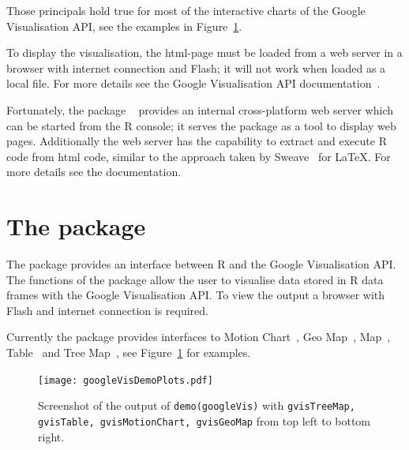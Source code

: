 Those principals hold true for most of the interactive charts of the
Google Visualisation API, see the examples in Figure~\ref{demos}.

To display the visualisation, the html-page must be loaded from a
web server in a browser with internet connection and Flash; it will not
work when loaded as a local file. For more details see the Google
Visualisation API documentation~\cite{GoogleMotionChart}.

Fortunately, the package \rsp~\cite{Rsp} provides an internal
cross-platform web server which can be started from the R console; it
serves the \googleVis package as a tool to display web
pages. Additionally the \rsp  web server has the capability 
to extract and execute R code from html code, similar to the approach
taken by Sweave~\cite{Sweave2002} for \LaTeX. For more details see the
\rsp documentation.

\section{The \googleVis package}

The \googleVis package provides an interface between R and the Google
Visualisation API.  The functions of the package allow the user to
visualise data stored in R data frames with the Google  Visualisation
API.  To view the output a browser with Flash and internet  connection
is required.  

Currently the package provides interfaces to Motion
Chart~\cite{GoogleMotionChart}, Geo Map~\cite{GoogleGeoMap}, 
Map~\cite{GoogleMap}, Table~\cite{GoogleTable} and Tree
Map~\cite{GoogleTreeMap}, see Figure~\ref{demos} for examples.  

\begin{figure}%
\begin{center}
\texttt{[image: googleVisDemoPlots.pdf]}
\caption{
  Screenshot of the output of \texttt{demo(googleVis)} with 
  \texttt{gvisTreeMap,  gvisTable, gvisMotionChart, gvisGeoMap} from
  top left to bottom right.  
}\label{demos}
\end{center}
\end{figure}


